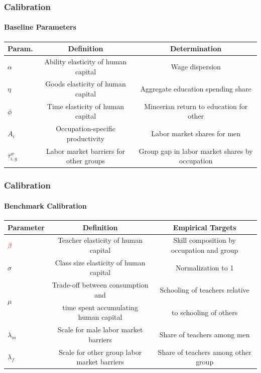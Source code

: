 \documentclass[11pt]{beamer}
\begin{document}
		\begin{frame}
			\frametitle{Calibration}
			\framesubtitle{Baseline Parameters}
			\tiny
			\begin{table}[h!]
				\centering
				\begin{tabular}{lcc}
					\toprule
					\toprule
					Param. & Definition & Determination\\
					\midrule
					$\alpha$ & Ability elasticity of human capital & Wage dispersion \\
					$\eta$ & Goods elasticity of human capital & Aggregate education spending share  \\
					$\phi$ & Time elasticity of human capital & Mincerian return to education for other \\
					$A_{i}$ & Occupation-specific productivity & Labor market shares for men\\
					$\tau^{w}_{i,g}$ & Labor market barriers for other groups & Group gap in labor market shares by occupation\\
					\bottomrule
				\end{tabular}
				\label{tab:param}
			\end{table}
		\end{frame}
		
		\begin{frame}
			\frametitle{Calibration}
			\framesubtitle{Benchmark Calibration}
			\tiny
			\begin{table}[h!]
				\centering
				\begin{tabular}{lcc}
					\toprule
					\toprule
					Parameter & Definition & Empirical Targets\\
					\midrule
					\textcolor{red}{$\beta$} & Teacher elasticity of human capital & Skill composition by occupation and group \\
					$\sigma$ & Class size elasticity of human capital & Normalization to 1\\
					\multirow{2}{*}{$\mu$} &  Trade-off between consumption and & Schooling of teachers relative\\
					& time spent accumulating human capital & to schooling of others\\
					$\lambda_m$ & Scale for male labor market barriers & Share of teachers among men\\
					$\lambda_f$ & Scale for other group labor market barriers & Share of teachers among other group\\
					\bottomrule
				\end{tabular}
				\label{tab:calibr}
			\end{table}
		\end{frame}
		
\end{document}
